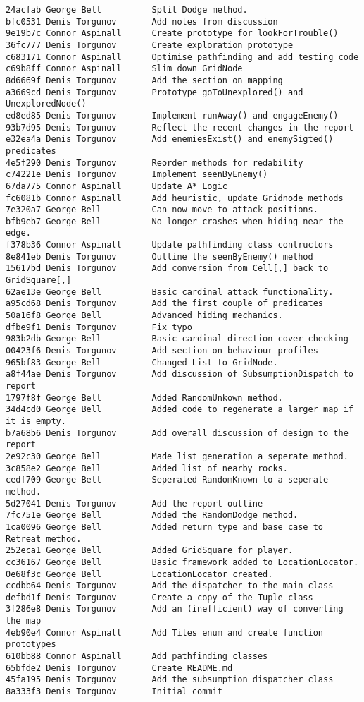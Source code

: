 \documentclass[11pt]{article}
\begin{document}
\begin{verbatim}
24acfab George Bell          Split Dodge method.
bfc0531 Denis Torgunov       Add notes from discussion
9e19b7c Connor Aspinall      Create prototype for lookForTrouble()
36fc777 Denis Torgunov       Create exploration prototype
c683171 Connor Aspinall      Optimise pathfinding and add testing code
c69b8ff Connor Aspinall      Slim down GridNode
8d6669f Denis Torgunov       Add the section on mapping
a3669cd Denis Torgunov       Prototype goToUnexplored() and UnexploredNode()
ed8ed85 Denis Torgunov       Implement runAway() and engageEnemy()
93b7d95 Denis Torgunov       Reflect the recent changes in the report
e32ea4a Denis Torgunov       Add enemiesExist() and enemySigted() predicates
4e5f290 Denis Torgunov       Reorder methods for redability
c74221e Denis Torgunov       Implement seenByEnemy()
67da775 Connor Aspinall      Update A* Logic
fc6081b Connor Aspinall      Add heuristic, update Gridnode methods
7e320a7 George Bell          Can now move to attack positions.
bfb9eb7 George Bell          No longer crashes when hiding near the edge.
f378b36 Connor Aspinall      Update pathfinding class contructors
8e841eb Denis Torgunov       Outline the seenByEnemy() method
15617bd Denis Torgunov       Add conversion from Cell[,] back to GridSquare[,]
62ae13e George Bell          Basic cardinal attack functionality.
a95cd68 Denis Torgunov       Add the first couple of predicates
50a16f8 George Bell          Advanced hiding mechanics.
dfbe9f1 Denis Torgunov       Fix typo
983b2db George Bell          Basic cardinal direction cover checking
00423f6 Denis Torgunov       Add section on behaviour profiles
965bf83 George Bell          Changed List to GridNode.
a8f44ae Denis Torgunov       Add discussion of SubsumptionDispatch to report
1797f8f George Bell          Added RandomUnkown method.
34d4cd0 George Bell          Added code to regenerate a larger map if it is empty.
b7a68b6 Denis Torgunov       Add overall discussion of design to the report
2e92c30 George Bell          Made list generation a seperate method.
3c858e2 George Bell          Added list of nearby rocks.
cedf709 George Bell          Seperated RandomKnown to a seperate method.
5d27041 Denis Torgunov       Add the report outline
7fc751e George Bell          Added the RandomDodge method.
1ca0096 George Bell          Added return type and base case to Retreat method.
252eca1 George Bell          Added GridSquare for player.
cc36167 George Bell          Basic framework added to LocationLocator.
0e68f3c George Bell          LocationLocator created.
ccdbb64 Denis Torgunov       Add the dispatcher to the main class
defbd1f Denis Torgunov       Create a copy of the Tuple class
3f286e8 Denis Torgunov       Add an (inefficient) way of converting the map
4eb90e4 Connor Aspinall      Add Tiles enum and create function prototypes
610bb88 Connor Aspinall      Add pathfinding classes
65bfde2 Denis Torgunov       Create README.md
45fa195 Denis Torgunov       Add the subsumption dispatcher class
8a333f3 Denis Torgunov       Initial commit
\end{verbatim}
\end{document}
